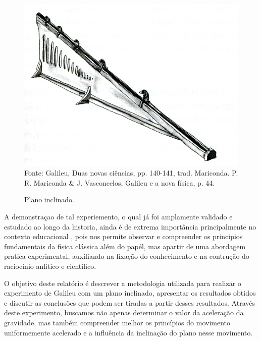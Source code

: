 \documentclass[a4paper, 12pt]{article}
\begin{document}
\begin{figure}[!htpb]
	\centering
	\caption{Plano inclinado.}
	\includegraphics[scale=0.25]{./pictures/planoInclinado.png}
	Fonte: Galileu, Duas novas ciências, pp. 140-141, trad. Mariconda. P. R. Mariconda \& J. Vasconcelos, Galileu e a nova física, p. 44.
\end{figure}

A demonstraçao de tal experiemento, o qual já foi amplamente validado e estudado ao longo da historia, ainda é de extrema importância principalmente no contexto educacional \cite{Silva2023}, pois nos permite observar e compreender os principios fundamentais da fisica clássica além do papél, mas apartir de uma abordagem pratica experimental, auxiliando na fixação do conhecimento e na contrução do raciocinio anlitico e científico.

O objetivo deste relatório é descrever a metodologia utilizada para realizar o experimento de Galileu com um plano inclinado, apresentar os resultados obtidos e discutir as conclusões que podem ser tiradas a partir desses resultados. Através deste experimento, buscamos não apenas determinar o valor da aceleração da gravidade, mas também compreender melhor os princípios do movimento uniformemente acelerado e a influência da inclinação do plano nesse movimento.

\end{document}
